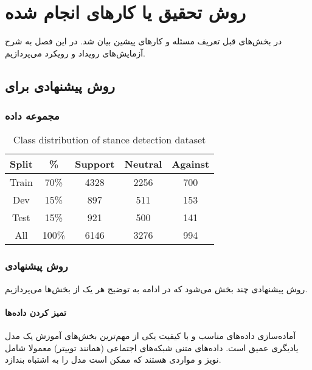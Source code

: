 
\chapter{روش تحقیق یا کارهای انجام شده}
\thispagestyle{empty}
در بخش‌های قبل تعریف مسئله و کارهای پیشین بیان شد. در این فصل به شرح آزمایش‌های رویداد 
و رویکرد 
می‌پردازیم.

\section{روش پیشنهادی برای}

\subsection{مجموعه داده}

\begin{table}[ht]
	\centering
	\small
	\begin{tabular}{ c|c|   c c c}
		\hline
		Split & \% & Support & Neutral &  Against\\
		\hline
		\hline
		Train & 70\% & 4328 & 2256 & 700 \\
		Dev & 15\% & 897 & 511 & 153  \\  
		Test & 15\% & 921 & 500 & 141\\
		\hline
		\hline
		All & 100\% & 6146 & 3276  & 994 \\
		\hline
	\end{tabular}
	\caption{\label{dataset-statistics} Class distribution of stance detection dataset}
\end{table}


\subsection{روش پیشنهادی}
روش پیشنهادی چند بخش می‌شود که در ادامه به توضیح هر یک از بخش‌ها می‌پردازیم.

\subsubsection{تمیز کردن داده‌ها}
آماده‌سازی داده‌های مناسب و با کیفیت یکی از مهم‌ترین بخش‌های آموزش یک مدل یادیگری عمیق است. داده‌های متنی شبکه‌های اجتماعی (همانند توییتر) معمولا شامل نویز و مواردی هستند که ممکن است مدل را به اشتباه بندازد.

